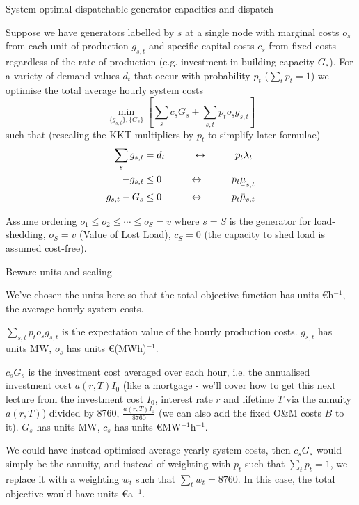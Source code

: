 \documentclass[10pt,aspectratio=169,dvipsnames]{beamer}
\def\l{\lambda}
\def\m{\mu}
\newcommand{\ubar}[1]{\text{\b{$#1$}}}
\begin{document}
\begin{frame}{System-optimal dispatchable generator capacities and dispatch}

  Suppose we have generators labelled by $s$ at a single node with \alert{marginal costs} $o_s$ from each unit of
  production $g_{s,t}$ and \alert{specific capital costs} $c_s$ from fixed costs
  regardless of the rate of production (e.g. investment in building
  capacity $G_s$).   For a variety of demand values $d_t$ that occur with probability $p_t$ ($\sum_t p_t = 1$)   we optimise the total \alert{average hourly system costs}
  \begin{equation*}
    \min_{\{g_{s,t}\},\{G_s\}}  \left[\sum_{s}c_s G_s +  \sum_{s,t} p_t o_{s} g_{s,t} \right]
  \end{equation*}
  such that (rescaling the KKT multipliers by $p_t$ to simplify later formulae)
  \begin{align*}
    \sum_s g_{s,t} & = d_t  \hspace{1cm}\leftrightarrow\hspace{1cm} p_t \l_t \\
    - g_{s,t}  & \leq  0  \hspace{1cm}\leftrightarrow\hspace{1cm} p_t \ubar{\m}_{s,t} \\
    g_{s,t} - G_s  & \leq 0  \hspace{1cm}\leftrightarrow\hspace{1cm} p_t \bar{\m}_{s,t}
  \end{align*}

  Assume ordering $o_1 \leq o_2 \leq \cdots \leq o_S = v$ where $s=S$ is the generator for load-shedding,
  $o_S = v$ (Value of Lost Load), $c_S=0$ (the capacity to shed load
  is assumed cost-free).

\end{frame}



\begin{frame}{Beware units and scaling}

  We've chosen the units here so that the total objective function has units \euro{}h$^{-1}$, the \alert{average hourly system costs}.

  $\sum_{s,t} p_t o_{s} g_{s,t}$ is the expectation value of the hourly production costs. $g_{s,t}$ has units MW, $o_{s}$ has units \euro{}(MWh)$^{-1}$.

  $c_sG_s$ is the investment cost averaged over each hour, i.e. the annualised investment cost $a(r,T)I_0$ (like a mortgage - we'll cover how to get this next lecture from the investment cost $I_0$, interest rate $r$ and lifetime $T$ via the annuity $a(r,T)$) divided by 8760, $\frac{a(r,T)I_0}{8760}$ (we can also add the fixed O\&{}M costs $B$ to it). $G_s$ has units MW, $c_s$ has units
  \euro{}MW$^{-1}$h$^{-1}$.

  We could have instead optimised \alert{average yearly system costs}, then $c_s G_s$ would simply be the annuity, and instead of weighting with $p_t$ such that $\sum_t p_t = 1$, we replace it with a weighting $w_t$ such that $\sum_t w_t = 8760$. In this case, the total objective would have units \euro{}a$^{-1}$.

\end{frame}
\end{document}
